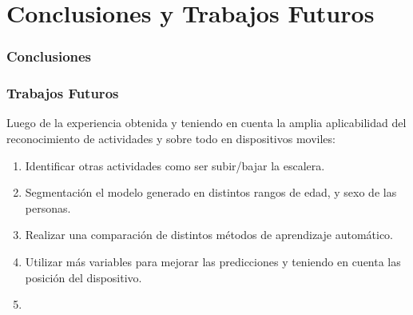 \chapter{Conclusiones y Trabajos Futuros}

\subsection{Conclusiones}


\subsection{Trabajos Futuros}
Luego de la experiencia obtenida y teniendo en cuenta la amplia aplicabilidad del reconocimiento de actividades y sobre todo en dispositivos moviles:
\begin{enumerate}
\item Identificar otras actividades como ser subir/bajar la escalera.
\item Segmentación el modelo generado en distintos rangos de edad, y sexo de las personas.
\item Realizar una comparación de distintos métodos de aprendizaje automático. 
\item Utilizar más variables para mejorar las predicciones y teniendo en cuenta las posición del dispositivo.
\item <Agregar un 5to trabajo futuro>
\end{enumerate}

